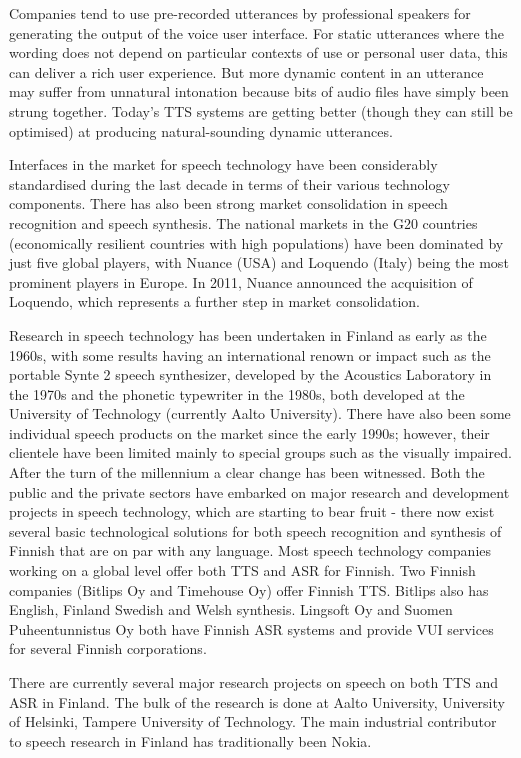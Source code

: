 \documentclass[]{../../metanetpaper}
\begin{document}
\begin{multicols}{2}
Companies tend to use pre-recorded utterances by professional speakers for
generating the output of the voice user interface. For static utterances where
the wording does not depend on particular contexts of use or personal user
data, this can deliver a rich user experience. But more dynamic content in an
utterance may suffer from unnatural intonation because bits of audio files have
simply been strung together. Today’s TTS systems are getting better (though
they can still be optimised) at producing natural-sounding dynamic utterances.

Interfaces in the market for speech technology have been
considerably standardised during the last decade in terms of their various
technology components. There has also been strong market consolidation in
speech recognition and speech synthesis. The national markets in the G20
countries (economically resilient countries with high populations) have been
dominated by just five global players, with Nuance (USA) and Loquendo (Italy)
being the most prominent players in Europe. In 2011, Nuance announced the
acquisition of Loquendo, which represents a further step in market
consolidation.

Research in speech technology has been undertaken in Finland as early as the
1960s, with some results having an international renown or impact such as the
portable Synte 2 speech synthesizer, developed by the Acoustics Laboratory in
the 1970s and the phonetic typewriter in the 1980s, both developed at the
University of Technology (currently Aalto University). There have also been
some individual speech products on the market since the early 1990s; however,
their clientele have been limited mainly to special groups such as the visually
impaired. After the turn of the millennium a clear change has been witnessed.
Both the public and the private sectors have embarked on major research and
development projects in speech technology, which are starting to bear fruit -
there now exist several basic technological solutions for both speech
recognition and synthesis of Finnish that are on par with any language. Most
speech technology companies working on a global level offer both TTS and ASR
for Finnish. Two Finnish companies (Bitlips Oy and Timehouse Oy) offer Finnish
TTS. Bitlips also has English, Finland Swedish and Welsh synthesis. Lingsoft Oy
and Suomen Puheentunnistus Oy both have Finnish ASR systems and provide VUI
services for several Finnish corporations.

There are currently several major research projects on speech on both TTS and
ASR in Finland. The bulk of the research is done at Aalto University,
University of Helsinki, Tampere University of Technology. The main industrial
contributor to speech research in Finland has traditionally been Nokia.


\end{multicols}
\end{document}
